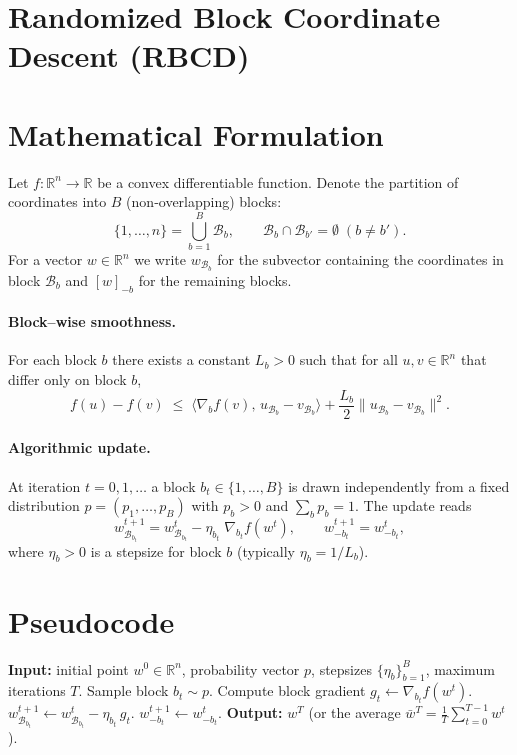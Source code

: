 \documentclass[11pt]{article}
\newcommand{\R}{\mathbb{R}}
\begin{document}
\section*{Randomized Block Coordinate Descent (RBCD)}

\section*{Mathematical Formulation}
Let $f:\R^{n}\rightarrow\R$ be a convex differentiable function.  
Denote the partition of coordinates into $B$ (non‑overlapping) blocks:
\[
\{1,\dots ,n\}= \bigcup_{b=1}^{B} \mathcal{B}_{b},\qquad 
\mathcal{B}_{b}\cap\mathcal{B}_{b'}=\emptyset\;(b\neq b').
\]
For a vector $w\in\R^{n}$ we write $w_{\mathcal{B}_{b}}$ for the subvector
containing the coordinates in block $\mathcal{B}_{b}$ and $[w]_{-b}$ for the
remaining blocks.

\paragraph{Block–wise smoothness.}  
For each block $b$ there exists a constant $L_{b}>0$ such that for all
$u,v\in\R^{n}$ that differ only on block $b$,
\[
f(u)-f(v)\;\le\;\langle \nabla_{b}f(v),\,u_{\mathcal{B}_{b}}-v_{\mathcal{B}_{b}}\rangle
+\frac{L_{b}}{2}\|u_{\mathcal{B}_{b}}-v_{\mathcal{B}_{b}}\|^{2}.
\tag{1}
\]

\paragraph{Algorithmic update.}  
At iteration $t=0,1,\dots$ a block $b_{t}\in\{1,\dots ,B\}$ is drawn
independently from a fixed distribution $p=(p_{1},\dots ,p_{B})$ with
$p_{b}>0$ and $\sum_{b}p_{b}=1$.  The update reads
\[
w^{t+1}_{\mathcal{B}_{b_{t}}}=w^{t}_{\mathcal{B}_{b_{t}}}
-\eta_{b_{t}}\;\nabla_{b_{t}}f\!\left(w^{t}\right),\qquad
w^{t+1}_{-b_{t}}=w^{t}_{-b_{t}},
\tag{2}
\]
where $\eta_{b}>0$ is a stepsize for block $b$ (typically $\eta_{b}=1/L_{b}$).

\section*{Pseudocode}
\begin{algorithm}[H]
\caption{Randomized Block Coordinate Descent}
\begin{algorithmic}[1]
\State \textbf{Input:} initial point $w^{0}\in\R^{n}$,
probability vector $p$, stepsizes $\{\eta_{b}\}_{b=1}^{B}$,
maximum iterations $T$.
    \State Sample block $b_{t}\sim p$.
    \State Compute block gradient $g_{t}\gets\nabla_{b_{t}}f(w^{t})$.
    \State $w^{t+1}_{\mathcal{B}_{b_{t}}}\gets
          w^{t}_{\mathcal{B}_{b_{t}}}-\eta_{b_{t}}\,g_{t}$.
    \State $w^{t+1}_{-b_{t}}\gets w^{t}_{-b_{t}}$.
\EndFor
\State \textbf{Output:} $w^{T}$ (or the average $\bar w^{T}=\frac1T\sum_{t=0}^{T-1}w^{t}$).
\end{algorithmic}
\end{algorithm}
\end{document}
